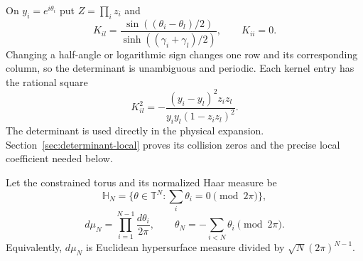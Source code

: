 \documentclass[11pt]{article}
\numberwithin{equation}{section}
\theoremstyle{remark}\newtheorem{remark}[theorem]{Remark}
\begin{document}
On $y_i=e^{i\theta_i}$ put $Z=\prod_i z_i$ and
\begin{equation}\label{eq:angular-kernel}
 K_{il}=\frac{\sin((\theta_i-\theta_l)/2)}
                  {\sinh((\gamma_i+\gamma_l)/2)},
 \qquad K_{ii}=0.
\end{equation}
Changing a half-angle or logarithmic sign changes one row and its
corresponding column, so the determinant is unambiguous and periodic.
Each kernel entry has the rational square
\begin{equation}\label{eq:kernel-square}
 K_{il}^2=-\frac{(y_i-y_l)^2z_i z_l}
                    {y_i y_l(1-z_i z_l)^2}.
\end{equation}
The determinant is used directly in the physical expansion.
Section~\ref{sec:determinant-local} proves its collision zeros
and the precise local coefficient needed below.

Let the constrained torus and its normalized Haar measure be
\[
 \mathbb H_N=\{\theta\in\mathbb T^N:
                      \textstyle\sum_i\theta_i=0\pmod{2\pi}\},
\]
\[
 d\mu_N=\prod_{i=1}^{N-1}\frac{d\theta_i}{2\pi},
 \qquad \theta_N=-\sum_{i<N}\theta_i\pmod{2\pi}.
\]
Equivalently, $d\mu_N$ is Euclidean hypersurface measure divided
by $\sqrt N(2\pi)^{N-1}$.
\end{document}
